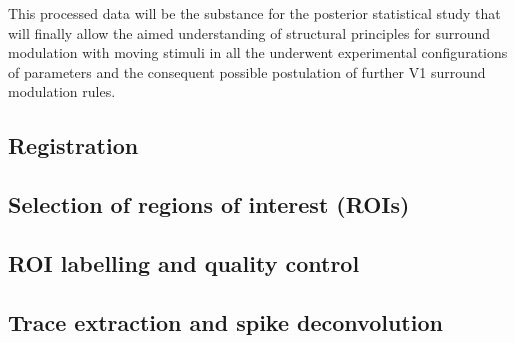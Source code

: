 




This processed data will be the substance for the posterior statistical study that will finally allow the aimed understanding of structural principles for surround modulation with moving stimuli in all the underwent experimental configurations of parameters and the consequent possible postulation of further V1 surround modulation rules.

\subsection{Registration}
\label{subsec:subasectionA}

\subsection{Selection of regions of interest (ROIs)}

\subsection{ROI labelling and quality control}

\subsection{Trace extraction and spike deconvolution}